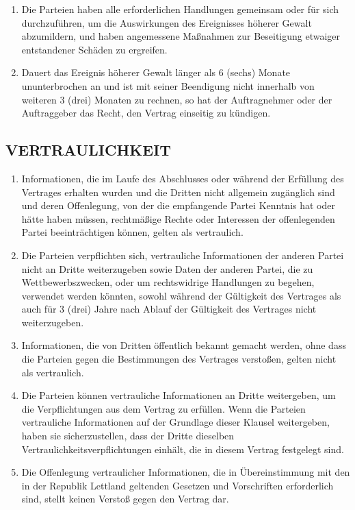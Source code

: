 \begin{multicols}{2}
\begin{enumerate}
   \item Die Parteien haben alle erforderlichen Handlungen gemeinsam oder für sich durchzuführen, um die Auswirkungen des Ereignisses höherer Gewalt abzumildern, und haben angemessene Maßnahmen zur Beseitigung etwaiger entstandener Schäden zu ergreifen.
   \item Dauert das Ereignis höherer Gewalt länger als 6 (sechs) Monate ununterbrochen an und ist mit seiner Beendigung nicht innerhalb von weiteren 3 (drei) Monaten zu rechnen, so hat der Auftragnehmer oder der Auftraggeber das Recht, den Vertrag einseitig zu kündigen.
   \end{enumerate}

   \subsection{VERTRAULICHKEIT}
   \begin{enumerate}
   \item Informationen, die im Laufe des Abschlusses oder während der Erfüllung des Vertrages erhalten wurden und die Dritten nicht allgemein zugänglich sind und deren Offenlegung, von der die empfangende Partei Kenntnis hat oder hätte haben müssen, rechtmäßige Rechte oder Interessen der offenlegenden Partei beeinträchtigen können, gelten als vertraulich.
   \item Die Parteien verpflichten sich, vertrauliche Informationen der anderen Partei nicht an Dritte weiterzugeben sowie Daten der anderen Partei, die zu Wettbewerbszwecken, oder um rechtswidrige Handlungen zu begehen, verwendet werden könnten, sowohl während der Gültigkeit des Vertrages als auch für 3 (drei) Jahre nach Ablauf der Gültigkeit des Vertrages nicht weiterzugeben.
   \item Informationen, die von Dritten öffentlich bekannt gemacht werden, ohne dass die Parteien gegen die Bestimmungen des Vertrages verstoßen, gelten nicht als vertraulich.
   \item Die Parteien können vertrauliche Informationen an Dritte weitergeben, um die Verpflichtungen aus dem Vertrag zu erfüllen. Wenn die Parteien vertrauliche Informationen auf der Grundlage dieser Klausel weitergeben, haben sie sicherzustellen, dass der Dritte dieselben Vertraulichkeitsverpflichtungen einhält, die in diesem Vertrag festgelegt sind.
   \item Die Offenlegung vertraulicher Informationen, die in Übereinstimmung mit den in der Republik Lettland geltenden Gesetzen und Vorschriften erforderlich sind, stellt keinen Verstoß gegen den Vertrag dar.

\end{enumerate}
\end{multicols}
